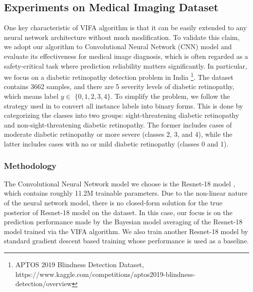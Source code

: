 \documentclass[10pt]{article} %
\begin{document}
\subsection{Experiments on Medical Imaging Dataset}

One key characteristic of VIFA algorithm is that it can be easily extended to any neural network architecture without much modification. To validate this claim, we adopt our algorithm to Convolutional Neural Network (CNN) model and evaluate its effectiveness for medical image diagnosis, which is often regarded as a safety-critical task where prediction reliability matters significantly. In particular, we focus on a diabetic retinopathy detection problem in India \footnote{APTOS 2019 Blindness Detection Dataset, https://www.kaggle.com/competitions/aptos2019-blindness-detection/overview}. The dataset contains 3662 samples, and there are 5 severity levels of diabetic retinopathy, which means label $y \in$ $\{0,1,2,3,4\}$. To simplify the problem, we follow the strategy used in \citet{leibig2017leveraging} to convert all instance labels into binary forms. This is done by categorizing the classes into two groups: sight-threatening diabetic retinopathy and non-sight-threatening diabetic retinopathy. The former includes cases of moderate diabetic retinopathy or more severe (classes 2, 3, and 4), while the latter includes cases with no or mild diabetic retinopathy (classes 0 and 1).

\subsubsection{Methodology}

The Convolutional Neural Network model we choose is the Resnet-18 model \citep{he2016deep}, which contains roughly 11.2M trainable parameters. Due to the non-linear nature of the neural network model, there is no closed-form solution for the true posterior of Resnet-18 model on the dataset. In this case, our focus is on the prediction performance made by the Bayesian model averaging of the Resnet-18 model trained via the VIFA algorithm. We also train another Resnet-18 model by standard  gradient descent based training whose performance is used as a baseline. 
\end{document}
